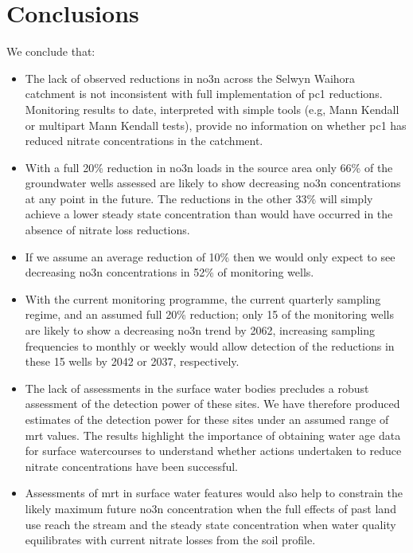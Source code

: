 \pagebreak
\section[Conclusions]{Conclusions} \label{sec:conclusions}

We conclude that:
\begin{itemize}
    \item The lack of observed reductions in \gls{no3n} across the Selwyn Waihora catchment is not inconsistent with full implementation of \gls{pc1} reductions. Monitoring results to date, interpreted with simple tools (e.g, Mann Kendall or multipart Mann Kendall tests), provide no information on whether \gls{pc1} has reduced nitrate concentrations in the catchment.
    \item With a full 20\% reduction in \gls{no3n} loads in the source area only 66\% of the groundwater wells assessed are likely to show decreasing \gls{no3n} concentrations at any point in the future. The reductions in the other 33\% will simply achieve a lower steady state concentration than would have occurred in the absence of nitrate loss reductions.
    \item If we assume an average reduction of 10\% then we would only expect to see decreasing \gls{no3n} concentrations in 52\% of monitoring wells.
    \item With the current monitoring programme, the current quarterly sampling regime, and an assumed full 20\% reduction; only 15 of the monitoring wells are likely to show a decreasing \gls{no3n} trend by 2062, increasing sampling frequencies to monthly or weekly would allow detection of the reductions in these 15 wells by 2042 or 2037, respectively.
    \item The lack of  assessments in the surface water bodies precludes a robust assessment of the detection power of these sites. We have therefore produced estimates of the detection power for these sites under an assumed range of \gls{mrt} values. The results highlight the importance of obtaining water age data for surface watercourses to understand whether actions undertaken to reduce nitrate concentrations have been successful.
    \item Assessments of \gls{mrt} in surface water features would also help to constrain the likely maximum future \gls{no3n} concentration when the full effects of past land use reach the stream and the steady state concentration when water quality equilibrates with current nitrate losses from the soil profile.

\end{itemize}
